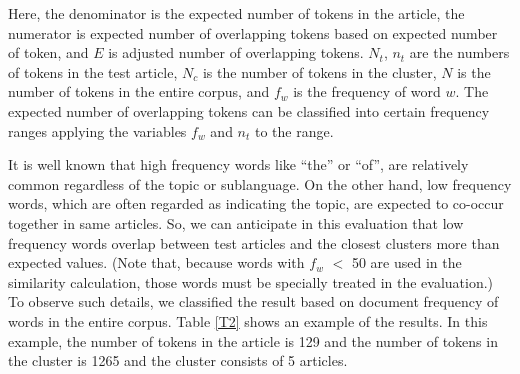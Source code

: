 Here, the denominator is the expected number of tokens in the article,
the numerator is expected number of overlapping tokens based on expected number of token,
and $E$ is adjusted number of overlapping tokens.
$N_{t}$, $n_{t}$ are the numbers of tokens in the test article,
$N_{c}$ is the number of tokens in the cluster,
$N$ is the number of tokens in the entire corpus,
and $f_{w}$ is the frequency of word $w$.
The expected number of overlapping tokens can be classified into certain frequency ranges
applying the variables $f_{w}$ and $n_{t}$ to the range.

It is well known that high frequency words like ``the'' or ``of'',
are relatively common regardless of the topic or sublanguage.
On the other hand, low frequency words, which are often regarded as
indicating the topic, are expected to co-occur together in same articles.
So, we can anticipate in this evaluation that
low frequency words overlap between test articles and
the closest clusters more than expected values.
(Note that, because words with $f_{w}$ $<$ 50 are used
 in the similarity calculation,
 those words must be specially treated in the evaluation.)
To observe such details, we classified the result based on document frequency of words
in the entire corpus.
Table \ref{T2} shows an example of the results.
In this example, the number of tokens in the article is 129 and
the number of tokens in the cluster is 1265 and the cluster consists of 5 articles.

